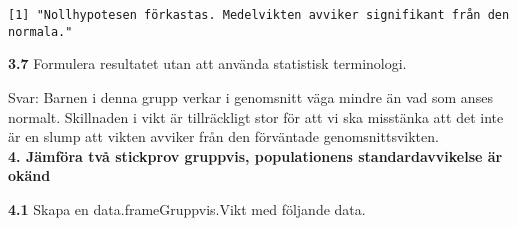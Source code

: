 \documentclass[
  letterpaper,
  DIV=11,
  numbers=noendperiod]{scrartcl}
\begin{document}
\begin{verbatim}
[1] "Nollhypotesen förkastas. Medelvikten avviker signifikant från den normala."
\end{verbatim}

\textbf{3.7} Formulera resultatet utan att använda statistisk
terminologi.

\hfill\break
Svar: Barnen i denna grupp verkar i genomsnitt väga mindre än vad som
anses normalt. Skillnaden i vikt är tillräckligt stor för att vi ska
misstänka att det inte är en slump att vikten avviker från den
förväntade genomsnittsvikten.\\

\textbf{4. Jämföra två stickprov gruppvis, populationens
standardavvikelse är okänd}

\textbf{4.1} Skapa en data.frameGruppvis.Vikt med följande data.
\end{document}
